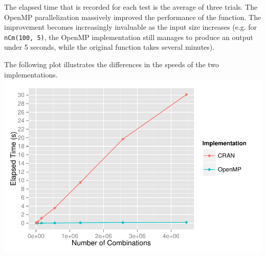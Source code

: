 The elapsed time that is recorded for each test is the average of three trials. The OpenMP parallelization massively improved the performance of the function. The improvement becomes increasingly invaluable as the input size increases (e.g. for \texttt{nCm(100, 5)}, the OpenMP implementation still manages to produce an output under 5 seconds, while the original function takes several minutes).\\
\null

The following plot illustrates the differences in the speeds of the two implementations.\\
\includegraphics{openmp.pdf}

